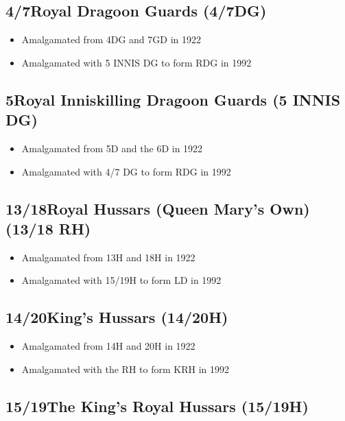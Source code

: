 \subsection*{4\nth/7\nth Royal Dragoon Guards (4/7DG)}

\begin{itemize}
\item Amalgamated from 4DG and 7GD in 1922
\item Amalgamated with 5 INNIS DG to form RDG in 1992
\end{itemize}

\subsection*{5\nth Royal Inniskilling Dragoon Guards (5 INNIS DG)}

\begin{itemize}
\item Amalgamated from 5D and the 6D in 1922
\item Amalgamated with 4/7 DG to form RDG in 1992
\end{itemize}

\subsection*{13\nth/18\nth Royal Hussars (Queen Mary's Own) (13/18 RH)}

\begin{itemize}
\item Amalgamated from 13H and 18H in 1922
\item Amalgamated with 15/19H to form LD in 1992
\end{itemize}

\subsection*{14\nth/20\nth King's Hussars (14/20H)}

\begin{itemize}
\item Amalgamated from 14H and 20H in 1922
\item Amalgamated with the RH to form KRH in 1992
\end{itemize}

\subsection*{15\nth/19\nth The King's Royal Hussars (15/19H)}

